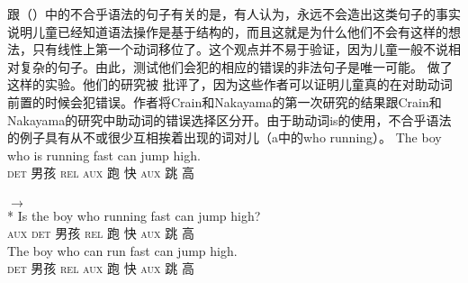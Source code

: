 跟（）中的不合乎语法的句子有关的是，有人认为，永远不会造出这类句子的事实说明儿童已经知道语法操作是基于结构的，而且这就是为什么他们不会有这样的想法，只有线性上第一个动词移位了\citep{CN87a-u}。这个观点并不易于验证，因为儿童一般不说相对复杂的句子。由此，测试他们会犯的相应的错误的非法句子是唯一可能。 \citet{CN87a-u}做了这样的实验。他们的研究被 \citet*{ARP2008a}批评了，因为这些作者可以证明儿童真的在对助动词前置的时候会犯错误。作者将Crain和Nakayama的第一次研究的结果跟Crain和Nakayama的研究中助动词的错误选择区分开。由于助动词is的使用，不合乎语法的例子具有从不或很少互相挨着出现的词对儿（a中的who running）。
\eal
\ex 
\gll  {} The boy who is running fast can jump high. \\
      {}              \textsc{det} 男孩 \textsc{rel} \textsc{aux} 跑 快 \textsc{aux} 跳 高\\
\glt {}\\
$\to$\\
 {}* \gll Is the boy who running fast can jump high?\\
          \textsc{aux} \textsc{det} 男孩 \textsc{rel} 跑 快 \textsc{aux} 跳 高\\
\ex 
\gll {} The boy who can run fast can jump high. \\
     {}              \textsc{det} 男孩 \textsc{rel} \textsc{aux} 跑 快 \textsc{aux} 跳 高\\
